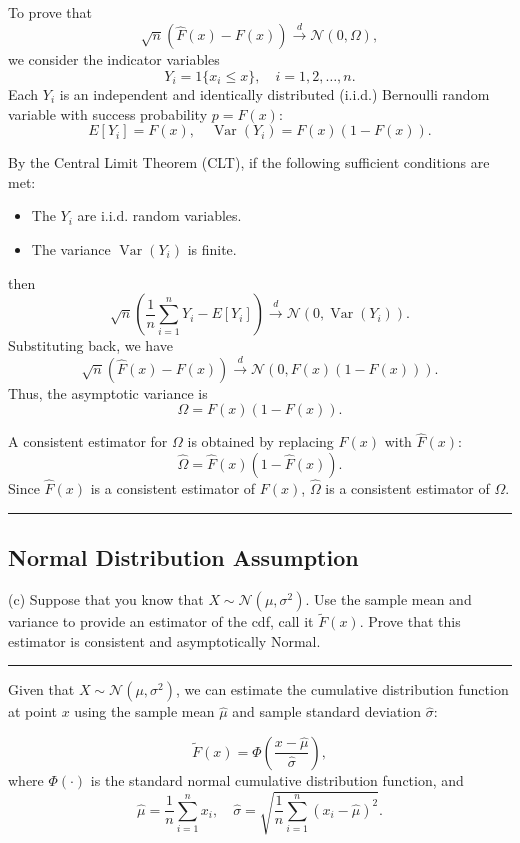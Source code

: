 \documentclass{article}
\newenvironment{colorparagraph}[1]{\par\color{#1}}{\par}
\begin{document}
To prove that
\[
\sqrt{n}(\hat{F}(x) - F(x)) \xrightarrow{d} \mathcal{N}(0, \Omega),
\]
we consider the indicator variables
\[
Y_i = 1\{ x_i \leq x \}, \quad i = 1, 2, \dots, n.
\]
Each \( Y_i \) is an independent and identically distributed (i.i.d.) Bernoulli random variable with success probability \( p = F(x) \):
\[
E[Y_i] = F(x), \quad \operatorname{Var}(Y_i) = F(x)(1 - F(x)).
\]

By the Central Limit Theorem (CLT), if the following sufficient conditions are met:
\begin{itemize}
    \item The \( Y_i \) are i.i.d. random variables.
    \item The variance \( \operatorname{Var}(Y_i) \) is finite.
\end{itemize}
then
\[
\sqrt{n}\left( \frac{1}{n} \sum_{i=1}^n Y_i - E[Y_i] \right) \xrightarrow{d} \mathcal{N}(0, \operatorname{Var}(Y_i)).
\]
Substituting back, we have
\[
\sqrt{n}(\hat{F}(x) - F(x)) \xrightarrow{d} \mathcal{N}\left( 0, F(x)(1 - F(x)) \right).
\]
Thus, the asymptotic variance is
\[
\Omega = F(x)(1 - F(x)).
\]

A consistent estimator for \( \Omega \) is obtained by replacing \( F(x) \) with \( \hat{F}(x) \):
\[
\hat{\Omega} = \hat{F}(x)\left( 1 - \hat{F}(x) \right).
\]
Since \( \hat{F}(x) \) is a consistent estimator of \( F(x) \), \( \hat{\Omega} \) is a consistent estimator of \( \Omega \).

\begin{colorparagraph}{questioncolor}
\label{q2c}
\rule{\textwidth}{0.5pt}
\subsection{Normal Distribution Assumption}
(c) Suppose that you know that \( X \sim \mathcal{N}(\mu, \sigma^2) \). Use the sample mean and variance to provide an estimator of the cdf, call it \( \tilde{F}(x) \). Prove that this estimator is consistent and asymptotically Normal.

\rule{\textwidth}{0.5pt}
\end{colorparagraph}

Given that \( X \sim \mathcal{N}(\mu, \sigma^2) \), we can estimate the cumulative distribution function at point \( x \) using the sample mean \( \hat{\mu} \) and sample standard deviation \( \hat{\sigma} \):

\[
\tilde{F}(x) = \Phi\left( \frac{x - \hat{\mu}}{\hat{\sigma}} \right),
\]
where \( \Phi(\cdot) \) is the standard normal cumulative distribution function, and
\[
\hat{\mu} = \frac{1}{n} \sum_{i=1}^n x_i, \quad \hat{\sigma} = \sqrt{\frac{1}{n} \sum_{i=1}^n (x_i - \hat{\mu})^2}.
\]
\end{document}
